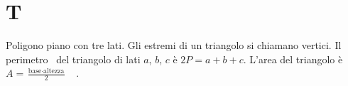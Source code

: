 \chapter{T}
\vspace{5mm} 
Poligono  piano con tre lati. Gli estremi di un triangolo si chiamano vertici. Il perimetro\pointsto~ del triangolo di lati $a$, $b$, $c$ è $2P=a+b+c$. L'area del triangolo è $A=\frac{\text{base}\cdot \text{altezza}}{2}$\pointsto~\pointsto~. 